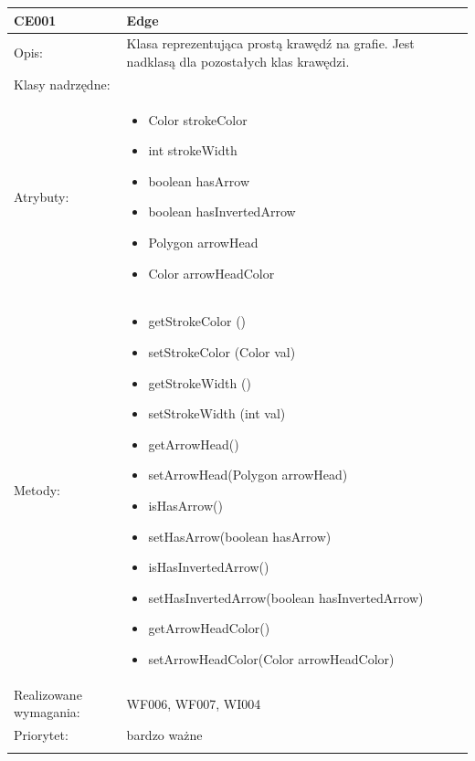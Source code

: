 \begin{center}

\begin{longtable}{|m{3cm}|m{9cm}|} \hline

CE001 & Edge \\ \hline
Opis: &  Klasa reprezentująca prostą krawędź na grafie. Jest nadklasą dla pozostałych klas krawędzi.  \\ \hline
Klasy nadrzędne: &     \\ \hline
Atrybuty: & \begin{itemize}
\item Color strokeColor
\item  int strokeWidth 
\item boolean hasArrow
\item    boolean hasInvertedArrow
  \item  Polygon arrowHead
  \item Color arrowHeadColor
\end{itemize}
 \\ \hline
Metody: & \begin{itemize}
 \item    getStrokeColor () 
\item setStrokeColor (Color val)
  \item  getStrokeWidth () 
\item setStrokeWidth (int val) 
\item getArrowHead()
\item setArrowHead(Polygon arrowHead)
\item isHasArrow()
 \item setHasArrow(boolean hasArrow)
  \item isHasInvertedArrow()
\item setHasInvertedArrow(boolean hasInvertedArrow)
\item getArrowHeadColor()
 \item setArrowHeadColor(Color arrowHeadColor)
\end{itemize}
  \\ \hline
Realizowane wymagania: & WF006, WF007, WI004 \\ \hline
Priorytet: & bardzo ważne  \\ \hline

\multicolumn{2}{c}{} \\
 \hline


\end{longtable}
\end{center}
